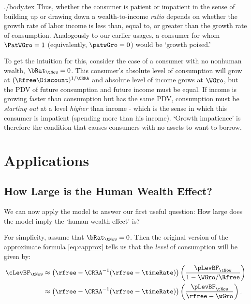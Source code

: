 \documentclass{handout}
\begin{document}
\begin{verbatimwrite}{./body.tex}
Thus, whether the consumer is patient or impatient in the sense of
building up or drawing down a wealth-to-income {\it ratio} depends on
whether the growth rate of labor income is less than, equal to, or
greater than the growth rate of consumption.  Analogously to our
earlier usages, a consumer for whom $\PatWGro=1$ (equivalently, $\patwGro= 0$) would be `growth poised.'

To get the intuition for this, consider the case of a consumer with no
nonhuman wealth, $\bRat_{\tNow}=0$.  This consumer's absolute level of
consumption will grow at $(\Rfree\Discount)^{1/\CRRA}$ and absolute
level of income grows at ${\WGro}$, but the PDV of future consumption
and future income must be equal.  If income is growing faster
than consumption but has the same PDV, consumption must be {\it starting
out} at a level {\it higher} than income - which is the sense in 
which this consumer is impatient (spending more than his income).  `Growth impatience' is
therefore the condition that causes consumers with no assets to want to borrow.

\section{Applications}

\subsection{How Large is the Human Wealth Effect?} \label{subsec:HWEffect}

We can now apply the model to answer our first useful question: How large does the model 
imply the `human wealth effect' is? 

For simplicity, assume that $\bRat_{\tNow} = 0$.  Then the original
version of the approximate formula \eqref{eq:capprox} tells us that the
{\it level} of consumption will be given by:
\begin{equation}\begin{gathered}\begin{aligned}
        \cLevBF_{\tNow} & \approx  \left(\rfree - \CRRA^{-1}(\rfree-\timeRate)\right)\left(\frac{\pLevBF_{\tNow}}{1-{\WGro}/\Rfree}\right)  \\
         & \approx  \left(\rfree - \CRRA^{-1}(\rfree-\timeRate)\right)\left(\frac{\pLevBF_{\tNow}}{\rfree-\wGro}\right). \label{eq:cofw2}
\end{aligned}\end{gathered}\end{equation}


\end{verbatimwrite}
\end{document}
